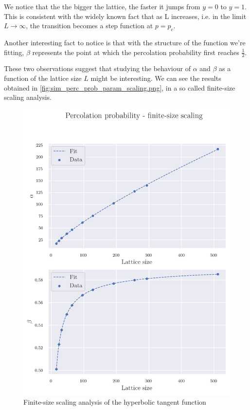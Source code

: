 We notice that the the bigger the lattice, the faster it jumps from $y=0$ to $y=1$. This is consistent with the widely known fact that as L increases, i.e. in the limit $L \rightarrow \infty $, the transition becomes a step function at $p = p_c$. 

Another interesting fact to notice is that with the structure of the function we're fitting, $\beta$ represents the point at which the percolation probability first reaches $\frac{1}{2}$.

These two observations suggest that studying the behaviour of $\alpha$ and $\beta$ as a function of the lattice size $L$ might be interesting. We can see the results obtained in \autoref{fig:sim_perc_prob_param_scaling.png}, in a so called finite-size scaling analysis.

\begin{figure}[H]
  \includegraphics[width=\linewidth]{Images/sim_perc_prob_param_scaling.png}
  \caption{Finite-size scaling analysis of the hyperbolic tangent function}
  \label{fig:sim_perc_prob_param_scaling.png}
\end{figure}

